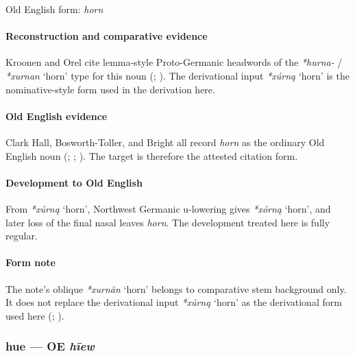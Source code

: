 \documentclass[
  british,
  a4paper,
]{article}
\providecommand{\Recon}[1]{\emph{*#1}}
\begin{document}
Old English form: \emph{horn}

\paragraph{Reconstruction and comparative
evidence}\label{reconstruction-and-comparative-evidence-39}

Kroonen and Orel cite lemma-style Proto-Germanic headwords of the
\emph{*hurna-} / \Recon{xurnan} `horn' type for this noun
(; ). The derivational input \Recon{xúrną} `horn' is the
nominative-style form used in the derivation here.

\paragraph{Old English evidence}\label{old-english-evidence-40}

Clark Hall, Bosworth-Toller, and Bright all record \emph{horn} as the
ordinary Old English noun (; ;
). The target is
therefore the attested citation form.

\paragraph{Development to Old
English}\label{development-to-old-english-40}

From \Recon{xúrną} `horn', Northwest Germanic u-lowering gives
\Recon{xórną} `horn', and later loss of the final nasal leaves
\emph{horn}. The development treated here is fully regular.

\paragraph{Form note}\label{form-note-10}

The note's oblique \Recon{xurnăn} `horn' belongs to comparative stem
background only. It does not replace the derivational input
\Recon{xúrną} `horn' as the derivational form used here
(; ).

\subsubsection{\texorpdfstring{hue --- OE
\emph{hīew}}{hue --- OE hīew}}\label{hue-oe-hux12bew}
\end{document}
